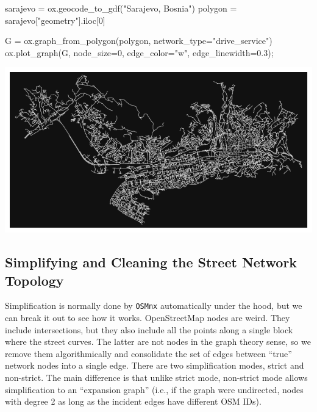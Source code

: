 \documentclass[
  letterpaper,
  DIV=11,
  numbers=noendperiod]{scrreprt}
\newenvironment{Shaded}{\begin{snugshade}}{\end{snugshade}}
\newcommand{\DecValTok}[1]{\textcolor[rgb]{0.68,0.00,0.00}{#1}}
\newcommand{\FloatTok}[1]{\textcolor[rgb]{0.68,0.00,0.00}{#1}}
\newcommand{\NormalTok}[1]{\textcolor[rgb]{0.00,0.23,0.31}{#1}}
\newcommand{\OperatorTok}[1]{\textcolor[rgb]{0.37,0.37,0.37}{#1}}
\newcommand{\StringTok}[1]{\textcolor[rgb]{0.13,0.47,0.30}{#1}}
\begin{document}
\begin{Shaded}
\begin{Highlighting}[]
\NormalTok{sarajevo }\OperatorTok{=}\NormalTok{ ox.geocode\_to\_gdf(}\StringTok{"Sarajevo, Bosnia"}\NormalTok{)}
\NormalTok{polygon }\OperatorTok{=}\NormalTok{ sarajevo[}\StringTok{"geometry"}\NormalTok{].iloc[}\DecValTok{0}\NormalTok{]}

\NormalTok{G }\OperatorTok{=}\NormalTok{ ox.graph\_from\_polygon(polygon, network\_type}\OperatorTok{=}\StringTok{"drive\_service"}\NormalTok{)}
\NormalTok{ox.plot\_graph(G, node\_size}\OperatorTok{=}\DecValTok{0}\NormalTok{, edge\_color}\OperatorTok{=}\StringTok{"w"}\NormalTok{, edge\_linewidth}\OperatorTok{=}\FloatTok{0.3}\NormalTok{)}\OperatorTok{;}
\end{Highlighting}
\end{Shaded}

\includegraphics{labs/w07_OSM_files/figure-pdf/cell-14-output-1.png}

\subsection{Simplifying and Cleaning the Street Network
Topology}\label{simplifying-and-cleaning-the-street-network-topology}

Simplification is normally done by \texttt{OSMnx} automatically under
the hood, but we can break it out to see how it works. OpenStreetMap
nodes are weird. They include intersections, but they also include all
the points along a single block where the street curves. The latter are
not nodes in the graph theory sense, so we remove them algorithmically
and consolidate the set of edges between ``true'' network nodes into a
single edge. There are two simplification modes, strict and non-strict.
The main difference is that unlike strict mode, non-strict mode allows
simplification to an ``expansion graph'' (i.e., if the graph were
undirected, nodes with degree 2 as long as the incident edges have
different OSM IDs).
\end{document}
